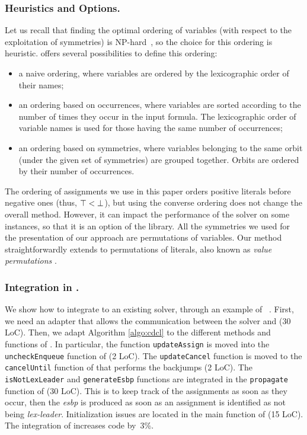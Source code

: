 \subsubsection{Heuristics and Options.} Let us recall that finding the optimal
ordering of variables (with respect to the exploitation of symmetries) is
NP-hard~\cite{luks.04.amai}, so the choice for this ordering is heuristic.
\libdsb{} offers several possibilities to define this ordering:
\begin{itemize}
 
 \item a naive ordering, where variables are ordered by the lexicographic
 order of their names;
 
 \item an ordering based on occurrences, where variables are sorted
 according to the number of times they occur in the input formula. The
 lexicographic order of variable names is used for those having the same number of
 occurrences;
 
 \item an ordering based on symmetries, where variables belonging to the
 same orbit (under the given set of symmetries) are grouped together. Orbits are
 ordered by their number of occurrences.
 
\end{itemize}
The ordering of assignments we use in this paper orders positive literals
before negative ones (thus, $\top < \bot$), but using the converse
ordering does not change the overall method. However, it can impact the
performance of the solver on some instances, so that it is an option of the
library.
All the symmetries we used for the presentation of our approach are
permutations of variables. Our method straightforwardly extends to permutations of literals, also known as \emph{value permutations} \cite{biere2009handbook}.

\subsubsection{Integration in \minisat{}.} We show how to integrate \libdsb{}
to an existing solver, through an example of \minisat{}~\cite{een2003extensible}.
First, we need an adapter that allows the communication between the solver and
\libdsb{} (30 LoC). Then, we adapt Algorithm \ref{algo:cdcl} to the different
methods and functions of \minisat{}. In particular, the function
\texttt{updateAssign} is moved into the \texttt{uncheckEnqueue} function of
\minisat{} (2 LoC). The \texttt{updateCancel} function is moved to the
\texttt{cancelUntil} function of \minisat{} that performs the backjumps (2
LoC). The \texttt{isNotLexLeader} and \texttt{generateEsbp} functions are
integrated in the \texttt{propagate} function of \minisat{} (30 LoC). This is
to keep track of the assignments as soon as they occur, then the
\textit{esbp} is produced as soon as an assignment is identified as not being
\emph{lex-leader}. Initialization issues are located in the main function of
\minisat (15 LoC).
The integration of \libdsb{} increases \minisat{} code by~3\%.
 
